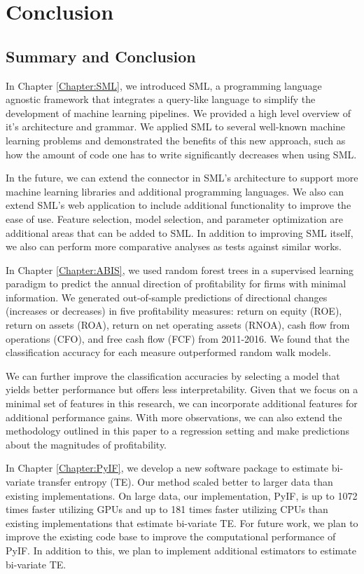 \chapter{Conclusion}


\section{Summary and Conclusion}

In Chapter \ref{Chapter:SML}, we introduced SML, a programming language agnostic framework that integrates a query-like language to simplify the development of machine learning pipelines.   We provided a high level overview of it’s architecture and grammar. We applied SML to several well-known machine learning problems and demonstrated the benefits of this new approach, such as how the amount of code one has to write significantly decreases when using SML.  

In the future, we can extend the connector in SML's architecture to support more machine learning libraries and additional programming languages.  We also can extend SML’s web application to include additional functionality to improve the ease of use.  Feature selection, model selection, and parameter optimization are additional areas that can be added to SML. In addition to improving SML itself, we also can perform more comparative analyses as tests against similar works.  

In Chapter \ref{Chapter:ABIS}, we used random forest trees in a supervised learning paradigm to predict the annual direction of profitability for firms with minimal information.  We generated out-of-sample predictions of directional changes (increases or decreases) in five profitability measures: return on equity (ROE), return on assets (ROA), return on net operating assets (RNOA), cash flow from operations (CFO), and free cash flow (FCF) from 2011-2016. We found that the classification accuracy for each measure outperformed  random walk models.

We can further improve the classification accuracies by selecting a model that yields better performance but offers less interpretability.  Given that we focus on a minimal set of features in this research, we can incorporate additional features for additional performance gains. With more observations, we can also extend the methodology outlined in this paper to a regression setting and make predictions about the magnitudes of profitability.

In Chapter \ref{Chapter:PyIF}, we develop a new software package to estimate bi-variate transfer entropy  (TE).  Our method scaled better to larger data than existing implementations.  On large data, our implementation, PyIF, is up to 1072 times faster utilizing GPUs and up to 181 times faster utilizing CPUs than existing implementations that estimate bi-variate TE. For future work, we plan to improve the existing code base to improve the computational performance of PyIF.  In addition to this, we plan to implement additional estimators to estimate bi-variate TE.


